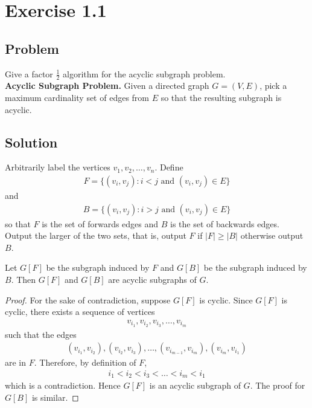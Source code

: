 \documentclass{article}
\begin{document}
\section*{Exercise 1.1}

\subsection*{Problem}

Give a factor $\frac{1}{2}$ algorithm for the acyclic subgraph problem. \\

\noindent
\textbf{Acyclic Subgraph Problem.} Given a directed graph $G = (V, E)$, pick a maximum 
cardinality set of edges from $E$ so that the resulting subgraph is acyclic.

\subsection*{Solution}

Arbitrarily label the vertices $v_1, v_2, \dots, v_n$. Define
\begin{align*}
    F = \{(v_i, v_j) : i < j \textrm{ and } (v_i, v_j) \in E\}
\end{align*}
and
\begin{align*}
    B = \{(v_i, v_j) : i > j \textrm{ and } (v_i, v_j) \in E\}
\end{align*}
so that $F$ is the set of forwards edges and $B$ is the set of backwards edges. Output 
the larger of the two sets, that is, output $F$ if $|F| \geq |B|$ otherwise output $B$. 

\begin{lemma*}
    Let $G[F]$ be the subgraph induced by $F$ and $G[B]$ be the subgraph induced by $B$.
    Then $G[F]$ and $G[B]$ are acyclic subgraphs of $G$.
\end{lemma*}

\begin{proof}
    For the sake of contradiction, suppose $G[F]$ is cyclic. Since $G[F]$ is cyclic, 
    there exists a sequence of vertices 
    \begin{align*}
        v_{i_1}, v_{i_2}, v_{i_3}, \dots, v_{i_m}
    \end{align*}
    such that the edges
    \begin{align*}
        (v_{i_1}, v_{i_2}), (v_{i_2}, v_{i_3}), \dots, (v_{i_{m-1}}, v_{i_m}), (v_{i_m}, v_{i_1})
    \end{align*}
    are in $F$. Therefore, by definition of $F$, 
    \begin{align*}
        i_1 < i_2 < i_3 < \dots < i_m < i_1
    \end{align*}
    which is a contradiction. Hence $G[F]$ is an acyclic subgraph of $G$. The proof for 
    $G[B]$ is similar.
\end{proof}
\end{document}
